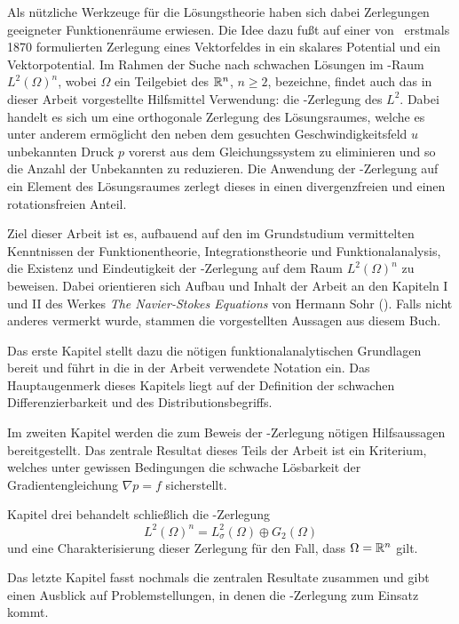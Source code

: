 Als nützliche Werkzeuge für die Lösungstheorie haben sich dabei Zerlegungen geeigneter Funktionenräume erwiesen. Die Idee dazu fußt auf einer von \helmholtz\ erstmals 1870 formulierten Zerlegung eines Vektorfeldes in ein skalares Potential und ein Vektorpotential.
Im Rahmen der Suche nach schwachen Lösungen im \hilbert\hyp{}Raum $L^2(\Omega)^n$, wobei $\Omega$ ein Teilgebiet des $\mathbb{R}^n$, $n \geq 2$, bezeichne, findet auch das in dieser Arbeit vorgestellte Hilfsmittel Verwendung: die \helmholtz\hyp{}Zerlegung des $L^2$.
Dabei handelt es sich um eine orthogonale Zerlegung des Lösungsraumes, welche es unter anderem ermöglicht den neben dem gesuchten Geschwindigkeitsfeld $u$ unbekannten Druck $p$ vorerst aus dem Gleichungssystem zu eliminieren und so die Anzahl der Unbekannten zu reduzieren.
Die Anwendung der \helmholtz\hyp{}Zerlegung auf ein Element des Lösungsraumes zerlegt dieses in einen divergenzfreien und einen rotationsfreien Anteil.

Ziel dieser Arbeit ist es, aufbauend auf den im Grundstudium vermittelten Kenntnissen der Funktionentheorie, Integrationstheorie und Funktionalanalysis, die Existenz und Eindeutigkeit der \helmholtz\hyp{}Zerlegung auf dem Raum $L^2(\Omega)^n$ zu beweisen.
Dabei orientieren sich Aufbau und Inhalt der Arbeit an den Kapiteln I und II des Werkes \emph{The Navier-Stokes Equations} von Hermann Sohr (\cite{sohr2001navier}).
Falls nicht anderes vermerkt wurde, stammen die vorgestellten Aussagen aus diesem Buch.

Das erste Kapitel stellt dazu die nötigen funktionalanalytischen Grundlagen bereit und führt in die in der Arbeit verwendete Notation ein.
Das Hauptaugenmerk dieses Kapitels liegt auf der Definition der schwachen Differenzierbarkeit und des Distributionsbegriffs.

Im zweiten Kapitel werden die zum Beweis der \helmholtz\hyp{}Zerlegung nötigen Hilfsaussagen bereitgestellt.
Das zentrale Resultat dieses Teils der Arbeit ist ein Kriterium, welches unter gewissen Bedingungen die schwache Lösbarkeit der Gradientengleichung $\nabla p = f$ sicherstellt.

Kapitel drei behandelt schließlich die \helmholtz\hyp{}Zerlegung $$L^2(\Omega)^n = L^2_\sigma(\Omega) \oplus G_2(\Omega)$$ und eine Charakterisierung dieser Zerlegung für den Fall, dass $\Omega = \mathbb{R}^n$ gilt.

Das letzte Kapitel fasst nochmals die zentralen Resultate zusammen und gibt einen Ausblick auf Problemstellungen, in denen die \helmholtz\hyp{}Zerlegung zum Einsatz kommt.
